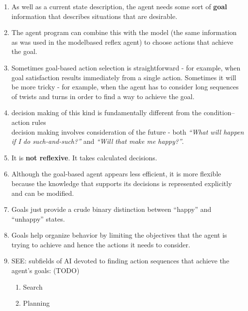 \begin{enumerate}
    \item As well as a current state description, the agent needs some sort of \textbf{goal} information that describes situations that are desirable.
    \hfill \cite{ai/book/Artificial-Intelligence-A-Modern-Approach/Russell-Norvig}

    \item  The agent program can combine this with the model (the same information as was used in the modelbased reflex agent) to choose actions that achieve the goal.
    \hfill \cite{ai/book/Artificial-Intelligence-A-Modern-Approach/Russell-Norvig}

    \item Sometimes goal-based action selection is straightforward - for example, when goal satisfaction results immediately from a single action. Sometimes it will be more tricky - for example, when the agent has to consider long sequences of twists and turns in order to find a way to achieve the goal.
    \hfill \cite{ai/book/Artificial-Intelligence-A-Modern-Approach/Russell-Norvig}

    \item decision making of this kind is fundamentally different from the condition–action rules \\
    decision making involves consideration of the future - both \textit{“What will happen if I do such-and-such?”} and \textit{“Will that make me happy?”}.
    \hfill \cite{ai/book/Artificial-Intelligence-A-Modern-Approach/Russell-Norvig}

    \item It is \textbf{not reflexive}. It takes calculated decisions.

    \item Although the goal-based agent appears less efficient, it is more flexible because the knowledge that supports its decisions is represented explicitly and can be modified.
    \hfill \cite{ai/book/Artificial-Intelligence-A-Modern-Approach/Russell-Norvig}

    \item Goals just provide a crude binary distinction between “happy” and “unhappy” states.
    \hfill \cite{ai/book/Artificial-Intelligence-A-Modern-Approach/Russell-Norvig}

    \item Goals help organize behavior by limiting the objectives that the agent is trying to achieve and hence the actions it needs  to consider.
    \hfill \cite{ai/book/Artificial-Intelligence-A-Modern-Approach/Russell-Norvig}

    \item SEE: subfields of AI devoted to finding action sequences that achieve the agent’s goals: (TODO)
    \begin{enumerate}
        \item Search
        \item Planning
    \end{enumerate}
\end{enumerate}

